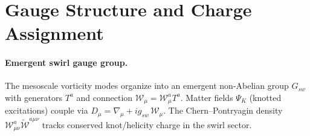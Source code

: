 \section{Gauge Structure and Charge Assignment}

 \paragraph{Emergent swirl gauge group.}
 The mesoscale vorticity modes organize into an emergent non-Abelian group \(G_{\!sw}\) with generators \(T^a\) and connection \(\mathcal{W}_\mu=\mathcal{W}_\mu^a T^a\).
 Matter fields \(\Psi_K\) (knotted excitations) couple via \(D_\mu=\nabla_\mu+i g_{\!sw}\,\mathcal{W}_\mu\).
 The Chern–Pontryagin density \(\mathcal{W}_{\mu\nu}^a\tilde{\mathcal{W}}^{a\mu\nu}\) tracks conserved knot/helicity charge in the swirl sector.

